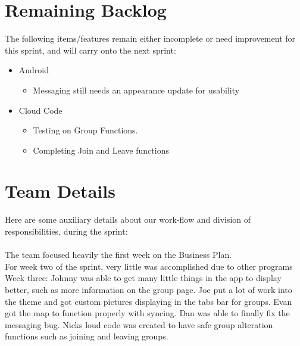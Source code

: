 \documentclass[11pt]{article}
\begin{document}
\section*{Remaining Backlog}
The following items/features remain either incomplete or need improvement for this sprint, and will carry onto the next sprint:
	\begin{itemize}
		\item Android
		\begin{itemize}
			\item Messaging still needs an appearance update for usability
		\end{itemize}
		\item Cloud Code
		\begin{itemize}
			\item Testing on Group Functions.
			\item Completing Join and Leave functions
		\end{itemize}
	\end{itemize}


	
\section*{Team Details}
Here are some auxiliary details about our work-flow and division of responsibilities, during the sprint: \\\\

The team focused heavily the first week on the Business Plan.\\

For week two of the sprint, very little was accomplished due to other programs\\

Week three: Johnny was able to get many little things in the app to display better, such as more information on the group page. Joe put a lot of work into the theme and got custom pictures displaying in the tabs bar for groups. Evan got the map to function properly with syncing. Dan was able to finally fix the messaging bug. Nicks loud code was created to have safe group alteration functions such as joining and leaving groups.\\
\end{document}
